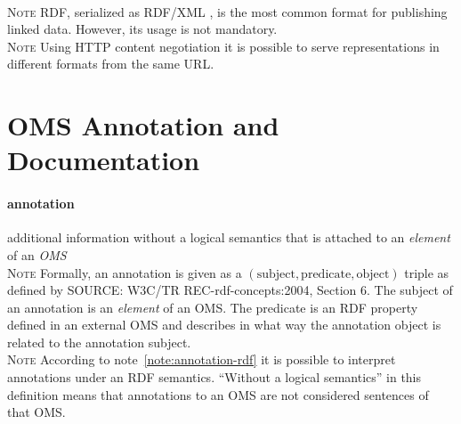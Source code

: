 \documentclass[10pt,%
\ifpretendfinal
final%
\else
draft%
\fi,
]{scrreprt}
\newcommand*{\termref}[1]{\textit{#1}}
\newcommand{\sclause}[1]{\section{#1}}
\newcommand{\termdefinition}[2]{\paragraph{#1} #2}
\newcommand{\nisref}[1]{#1}
\newenvironment{definitions}[0]{\medskip }{}
\newenvironment{note}[0]{\ \\ \textsc{Note} \quad}{}
\begin{document}
\begin{definitions}
  \begin{note}
    RDF, serialized as RDF/XML \cite{W3C:REC-rdf-syntax-grammar-20040210}, is the most common format for publishing linked data.  However, its usage is not mandatory.
  \end{note}
  \begin{note}
    Using HTTP content negotiation \cite{rfc2616} it is possible to serve representations in different formats from the same URL.
  \end{note}
\end{definitions}

\sclause{OMS Annotation and Documentation}\label{c:terms-annotation}
 
\begin{definitions}
  \termdefinition{annotation}{additional information without a logical semantics that is attached to an \termref{element} of an \termref{OMS}}
  \begin{note}\label{note:annotation-rdf}
    Formally, an annotation is given as a $(\text{subject}, \text{predicate}, \text{object})$ triple as defined by \nisref{SOURCE: W3C/TR REC-rdf-concepts:2004, Section 6}.  The subject of an annotation is an \termref{element} of an OMS.  The predicate is an RDF property defined in an external OMS and describes in what way the annotation object is related to the annotation subject.
  \end{note}
  \begin{note}
    According to note~\ref{note:annotation-rdf} it is possible to interpret annotations under an RDF semantics.  ``Without a logical semantics'' in this definition means that annotations to an OMS are not considered sentences of that OMS.
  \end{note}

  

\end{definitions}
\end{document}

